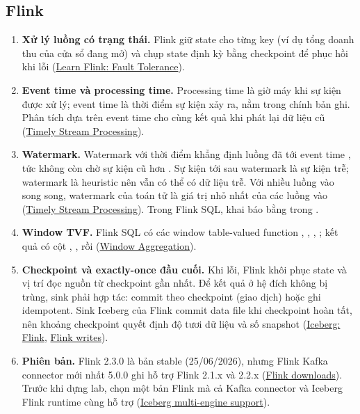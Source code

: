 \subsection{Flink}
\begin{enumerate}[resume]
  \item \textbf{Xử lý luồng có trạng thái.} Flink giữ state cho từng key (ví dụ tổng doanh thu của cửa sổ đang mở) và chụp state định kỳ bằng checkpoint để phục hồi khi lỗi (\href{https://nightlies.apache.org/flink/flink-docs-stable/docs/learn-flink/fault_tolerance/}{Learn Flink: Fault Tolerance}).
  \item \textbf{Event time và processing time.} Processing time là giờ máy khi sự kiện được xử lý; event time là thời điểm sự kiện xảy ra, nằm trong chính bản ghi. Phân tích dựa trên event time cho cùng kết quả khi phát lại dữ liệu cũ (\href{https://nightlies.apache.org/flink/flink-docs-stable/docs/concepts/time/}{Timely Stream Processing}).
  \item \textbf{Watermark.} Watermark với thời điểm  khẳng định luồng đã tới event time , tức không còn chờ sự kiện cũ hơn . Sự kiện tới sau watermark là sự kiện trễ; watermark là heuristic nên vẫn có thể có dữ liệu trễ. Với nhiều luồng vào song song, watermark của toán tử là giá trị nhỏ nhất của các luồng vào (\href{https://nightlies.apache.org/flink/flink-docs-stable/docs/concepts/time/}{Timely Stream Processing}). Trong Flink SQL, khai báo bằng  trong .
  \item \textbf{Window TVF.} Flink SQL có các window table-valued function , , , ; kết quả có cột , , rồi  (\href{https://nightlies.apache.org/flink/flink-docs-stable/docs/sql/reference/queries/window-agg/}{Window Aggregation}).
  \item \textbf{Checkpoint và exactly-once đầu cuối.} Khi lỗi, Flink khôi phục state và vị trí đọc nguồn từ checkpoint gần nhất. Để kết quả ở hệ đích không bị trùng, sink phải hợp tác: commit theo checkpoint (giao dịch) hoặc ghi idempotent. Sink Iceberg của Flink commit data file khi checkpoint hoàn tất, nên khoảng checkpoint quyết định độ tươi dữ liệu và số snapshot (\href{https://iceberg.apache.org/docs/latest/flink/}{Iceberg: Flink}, \href{https://iceberg.apache.org/docs/latest/flink-writes/}{Flink writes}).
  \item \textbf{Phiên bản.} Flink 2.3.0 là bản stable (25/06/2026), nhưng Flink Kafka connector mới nhất 5.0.0 ghi hỗ trợ Flink 2.1.x và 2.2.x (\href{https://flink.apache.org/downloads/}{Flink downloads}). Trước khi dựng lab, chọn một bản Flink mà cả Kafka connector và Iceberg Flink runtime cùng hỗ trợ (\href{https://iceberg.apache.org/multi-engine-support/}{Iceberg multi-engine support}).
\end{enumerate}

